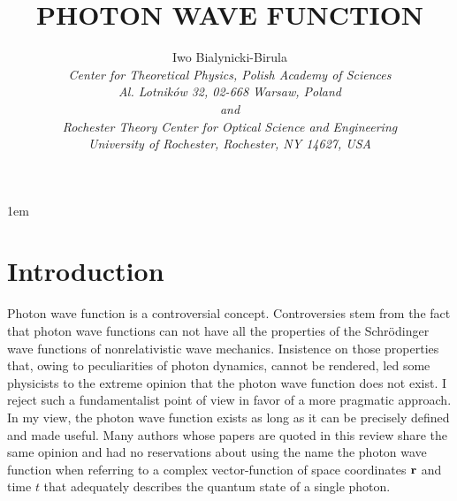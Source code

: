 \documentclass[11pt]{article}
\begin{document}
\ds@twoside




\def\@cite#1#2{{#1\if@tempswa , #2\fi}}
\def\@biblabel#1{#1}

\def\@listI{\leftmargin\leftmargini \parsep 0\p@ plus1\p@ minus\p@
\topsep 0\p@ plus3\p@ minus\p@
\itemsep 0\p@ plus1\p@ minus\p@}



  \ps@headings
\sloppy

\parindent1em

\title{PHOTON WAVE FUNCTION}

\author{Iwo Bialynicki-Birula\\
{\em Center for Theoretical Physics, Polish Academy of Sciences\\ Al.
Lotnik\'ow 32, 02-668 Warsaw, Poland\\and\\
Rochester Theory Center for Optical Science and Engineering\\
University of Rochester, Rochester, NY 14627, USA }}
\maketitle

\tableofcontents
\newpage
\pagestyle{plain}

\section{Introduction}

Photon wave function is a controversial concept. Controversies stem from the
fact that photon wave functions can not have all the properties of the
Schr\"odinger wave functions of nonrelativistic wave mechanics. Insistence
on those properties that, owing to peculiarities of photon dynamics, cannot
be rendered, led some physicists to the extreme opinion that the photon wave
function does not exist. I reject such a fundamentalist point of view in
favor of a more pragmatic approach. In my view, the photon wave function
exists as long as it can be precisely defined and made useful. Many authors
whose papers are quoted in this review share the same opinion and had no
reservations about using the name the photon wave function when referring to
a complex vector-function of space coordinates ${\bf r}$ and time $t$ that
adequately describes the quantum state of a single photon.
\end{document}
